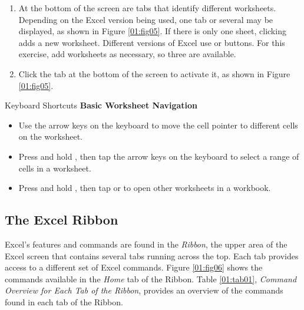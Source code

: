 \begin{enumbox}
	\begin{enumerate}
		\item At the bottom of the screen are tabs that identify different worksheets. Depending on the Excel version being used, one tab or several may be displayed, as shown in Figure \ref{01:fig05}. If there is only one sheet, clicking  adds a new worksheet. Different versions of Excel use \fmtButton{$ + $} or  buttons. For this exercise, add worksheets as necessary, so three are available.
		\item Click the  tab at the bottom of the screen to activate it, as shown in Figure \ref{01:fig05}.
	\end{enumerate}
\end{enumbox}

\begin{center}
	\begin{shtcutbox}{Keyboard Shortcuts}
		\textbf{Basic Worksheet Navigation}
		\\
		\begin{itemize}
			\setlength{\itemsep}{0pt}
			\setlength{\parskip}{0pt}
			\setlength{\parsep}{0pt}

			\item Use the arrow keys on the keyboard to move the cell pointer to different cells on the worksheet.
			\item Press and hold , then tap the arrow keys on the keyboard to select a range of cells in a worksheet.
			\item Press and hold , then tap  or  to open other worksheets in a workbook.

		\end{itemize}
	\end{shtcutbox}
\end{center}

\subsection{The Excel Ribbon}

Excel's features and commands are found in the \textit{Ribbon}, the upper area of the Excel screen that contains several tabs running across the top. Each tab provides access to a different set of Excel commands. Figure \ref{01:fig06} shows the commands available in the \textit{Home} tab of the Ribbon. Table \ref{01:tab01}, \textit{Command Overview for Each Tab of the Ribbon}, provides an overview of the commands found in each tab of the Ribbon.

